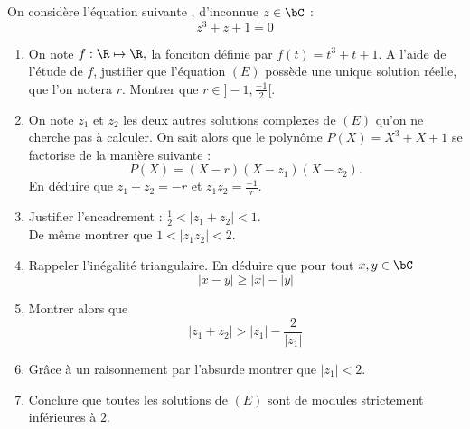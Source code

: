 \documentclass[a4paper, 11pt,reqno]{article}
\begin{document}
\begin{exercice}
On considère l'équation suivante , d'inconnue $z\in \bC$ : 
\begin{equation}\tag{$E$}
z^3 +z+1=0
\end{equation} 
\begin{enumerate}
\item On note $f : \R\mapsto \R, $ la fonciton définie par $f(t) = t^3+t+1.$
A l'aide de l'étude de $f$, justifier que l'équation $(E)$ possède une unique solution réelle, que l'on notera $r$. Montrer que $r \in ]-1, \frac{-1}{2}[$.
\item On note $z_1$ et $z_2$ les deux autres solutions complexes de $(E)$ qu'on ne cherche pas à calculer. On sait alors que le polynôme $P(X) = X^3+X+1$ se factorise de la manière suivante : 
$$P(X)  = (X-r)(X-z_1) (X-z_2).$$
En déduire que $z_1+z_2=-r$ et $z_1z_2=\frac{-1}{r}$.
\item Justifier l'encadrement  : $\frac{1}{2}<|z_1+z_2 |<1.$\\
De même montrer que  $1< |z_1z_2|< 2.$
\item Rappeler l'inégalité triangulaire. En déduire que pour tout $x,y\in \bC$ 
$$|x-y|\geq |x|-|y|$$
\item Montrer alors que  $$|z_1+z_2| >|z_1| -\frac{2}{|z_1|}$$
\item Grâce à un raisonnement par l'absurde montrer que $|z_1|<2$.
\item Conclure que toutes les solutions de $(E)$ sont de modules strictement inférieures à $2$. 
\end{enumerate}
\end{exercice}
\end{document}
